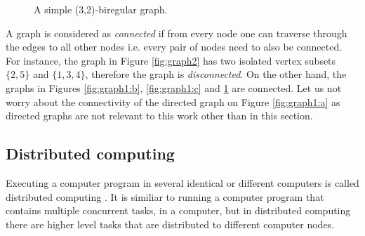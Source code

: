 \begin{figure}[H]
\centering
\caption{A simple (3,2)-biregular graph.\label{fig:graph3}}
\end{figure}


A graph is considered as \emph{connected} if from every node one can traverse through the edges to all other nodes i.e. every pair of nodes need to also be connected.
For instance, the graph in Figure \ref{fig:graph2} has two isolated vertex subsets $\{2, 5\}$ and $\{1, 3, 4\}$, therefore the graph is \emph{disconnected}.
On the other hand, the graphs in Figures \ref{fig:graph1:b}, \ref{fig:graph1:c} and \ref{fig:graph3} are connected.
Let us not worry about the connectivity of the directed graph on Figure \ref{fig:graph1:a} as directed graphs are not relevant to this work other than in this section.


\subsection{Distributed computing} \label{sec:distributed_computing}
Executing a computer program in several identical or different computers is called distributed computing
\cite{DBLP:books/el/leeuwen90/LamportL90}.
It is similiar to running a computer program that contains multiple concurrent tasks, in a computer, but in distributed computing there are higher level tasks that are distributed to different computer nodes.

